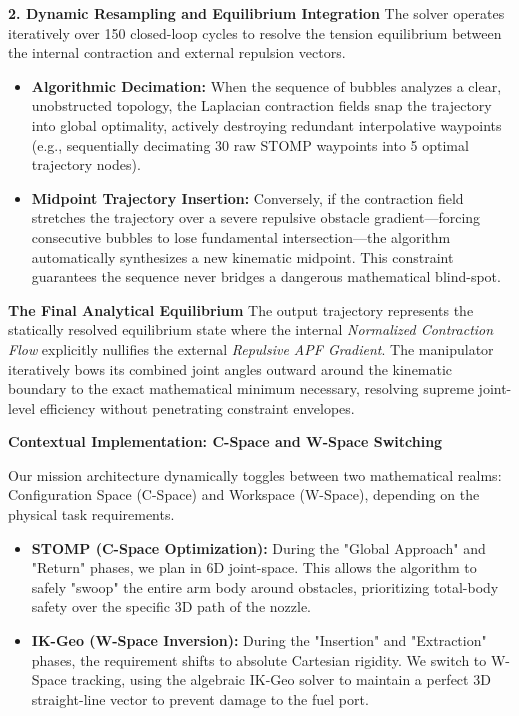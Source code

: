 \documentclass[11pt, a4paper]{article}
\begin{document}
\textbf{2. Dynamic Resampling and Equilibrium Integration}
The solver operates iteratively over 150 closed-loop cycles to resolve the tension equilibrium between the internal contraction and external repulsion vectors.
\begin{itemize}
    \item \textbf{Algorithmic Decimation:} When the sequence of bubbles analyzes a clear, unobstructed topology, the Laplacian contraction fields snap the trajectory into global optimality, actively destroying redundant interpolative waypoints (e.g., sequentially decimating 30 raw STOMP waypoints into 5 optimal trajectory nodes).
    \item \textbf{Midpoint Trajectory Insertion:} Conversely, if the contraction field stretches the trajectory over a severe repulsive obstacle gradient—forcing consecutive bubbles to lose fundamental intersection—the algorithm automatically synthesizes a new kinematic midpoint. This constraint guarantees the sequence never bridges a dangerous mathematical blind-spot.
\end{itemize}

\vspace{0.6cm}

\textbf{The Final Analytical Equilibrium}
The output trajectory represents the statically resolved equilibrium state where the internal \textit{Normalized Contraction Flow} explicitly nullifies the external \textit{Repulsive APF Gradient}. The manipulator iteratively bows its combined joint angles outward around the kinematic boundary to the exact mathematical minimum necessary, resolving supreme joint-level efficiency without penetrating constraint envelopes.

\clearpage



{\Large\textbf{Contextual Implementation: C-Space and W-Space Switching}}

Our mission architecture dynamically toggles between two mathematical realms: Configuration Space (C-Space) and Workspace (W-Space), depending on the physical task requirements.

\begin{itemize}
    \item \textbf{STOMP (C-Space Optimization):} During the "Global Approach" and "Return" phases, we plan in 6D joint-space. This allows the algorithm to safely "swoop" the entire arm body around obstacles, prioritizing total-body safety over the specific 3D path of the nozzle.
    \item \textbf{IK-Geo (W-Space Inversion):} During the "Insertion" and "Extraction" phases, the requirement shifts to absolute Cartesian rigidity. We switch to W-Space tracking, using the algebraic IK-Geo solver to maintain a perfect 3D straight-line vector to prevent damage to the fuel port.
\end{itemize}
\end{document}

